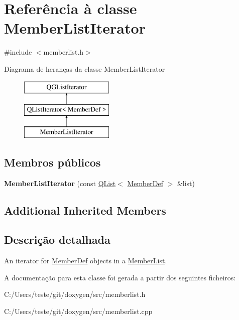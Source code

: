 \hypertarget{class_member_list_iterator}{\section{Referência à classe Member\-List\-Iterator}
\label{class_member_list_iterator}
}


{\ttfamily \#include $<$memberlist.\-h$>$}

Diagrama de heranças da classe Member\-List\-Iterator\begin{figure}[H]
\begin{center}
\leavevmode
\includegraphics[height=3.000000cm]{class_member_list_iterator}
\end{center}
\end{figure}
\subsection*{Membros públicos}
\begin{DoxyCompactItemize}
\item 
\hypertarget{class_member_list_iterator_a5df23d858cd9fc79d971100222c1160c}{{\bfseries Member\-List\-Iterator} (const \hyperlink{class_q_list}{Q\-List}$<$ \hyperlink{class_member_def}{Member\-Def} $>$ \&list)}\label{class_member_list_iterator_a5df23d858cd9fc79d971100222c1160c}

\end{DoxyCompactItemize}
\subsection*{Additional Inherited Members}


\subsection{Descrição detalhada}
An iterator for \hyperlink{class_member_def}{Member\-Def} objects in a \hyperlink{class_member_list}{Member\-List}. 

A documentação para esta classe foi gerada a partir dos seguintes ficheiros\-:\begin{DoxyCompactItemize}
\item 
C\-:/\-Users/teste/git/doxygen/src/memberlist.\-h\item 
C\-:/\-Users/teste/git/doxygen/src/memberlist.\-cpp\end{DoxyCompactItemize}
